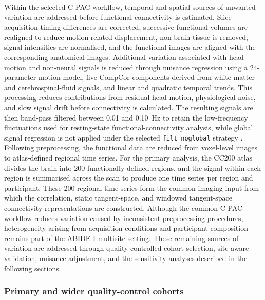 Within the selected C-PAC workflow, temporal and spatial sources of unwanted variation are addressed before functional connectivity is estimated. Slice-acquisition timing differences are corrected, successive functional volumes are realigned to reduce motion-related displacement, non-brain tissue is removed, signal intensities are normalised, and the functional images are aligned with the corresponding anatomical images. Additional variation associated with head motion and non-neural signals is reduced through nuisance regression using a 24-parameter motion model, five CompCor components derived from white-matter and cerebrospinal-fluid signals, and linear and quadratic temporal trends. This processing reduces contributions from residual head motion, physiological noise, and slow signal drift before connectivity is calculated. The resulting signals are then band-pass filtered between 0.01 and 0.10~Hz to retain the low-frequency fluctuations used for resting-state functional-connectivity analysis, while global signal regression is not applied under the selected \texttt{filt\_noglobal} strategy \citep{Craddocketal2013}. Following preprocessing, the functional data are reduced from voxel-level images to atlas-defined regional time series. For the primary analysis, the CC200 atlas divides the brain into 200 functionally defined regions, and the signal within each region is summarised across the scan to produce one time series per region and participant. These 200 regional time series form the common imaging input from which the correlation, static tangent-space, and windowed tangent-space connectivity representations are constructed. Although the common C-PAC workflow reduces variation caused by inconsistent preprocessing procedures, heterogeneity arising from acquisition conditions and participant composition remains part of the ABIDE-I multisite setting. These remaining sources of variation are addressed through quality-controlled cohort selection, site-aware validation, nuisance adjustment, and the sensitivity analyses described in the following sections.

\subsubsection{Primary and wider quality-control cohorts}
\label{subsubsec:cohorts}

